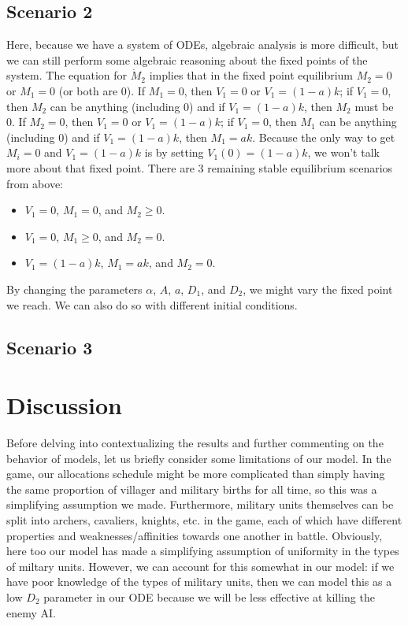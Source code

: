 \documentclass[12pt]{article}
\begin{document}
\subsection{Scenario 2}
Here, because we have a system of ODEs, algebraic analysis is more difficult, but we can still perform some algebraic reasoning about the fixed points of the system. The equation for $\dot M_2$ implies that in the fixed point equilibrium $M_2 = 0$ or $M_1 = 0$ (or both are 0). If $M_1=0$, then $V_1=0$ or $V_1=(1-a)k$; if $V_1 = 0$, then $M_2$ can be anything (including 0) and if $V_1 = (1-a)k$, then $M_2$ must be 0. If $M_2 = 0$, then $V_1=0$ or $V_1=(1-a)k$; if $V_1 = 0$, then $M_1$ can be anything (including 0) and if $V_1 = (1-a)k$, then $M_1 = ak$. Because the only way to get $M_i = 0$ and $V_1 = (1-a)k$ is by setting $V_1(0) = (1-a)k$, we won't talk more about that fixed point. There are 3 remaining stable equilibrium scenarios from above:
\begin{itemize}
\item $V_1 = 0$, $M_1 = 0$, and $M_2 \geq 0$.
\item $V_1 =0$, $M_1 \geq 0$, and $M_2 = 0$.
\item $V_1 = (1-a)k$, $M_1 = ak$, and $M_2 = 0$.
\end{itemize}

By changing the parameters $\alpha$, $A$, $a$, $D_1$, and $D_2$, we might vary the fixed point we reach. We can also do so with different initial conditions.
\subsection{Scenario 3}


\section{Discussion}
Before delving into contextualizing the results and further commenting on the behavior of models, let us briefly consider some limitations of our model. In the game, our allocations schedule might be more complicated than simply having the same proportion of villager and military births for all time, so this was a simplifying assumption we made. Furthermore, military units themselves can be split into archers, cavaliers, knights, etc. in the game, each of which have different properties and weaknesses/affinities towards one another in battle. Obviously, here too our model has made a simplifying assumption of uniformity in the types of miltary units. However, we can account for this somewhat in our model: if we have poor knowledge of the types of military units, then we can model this as a low $D_2$ parameter in our ODE because we will be less effective at killing the enemy AI.
\end{document}
